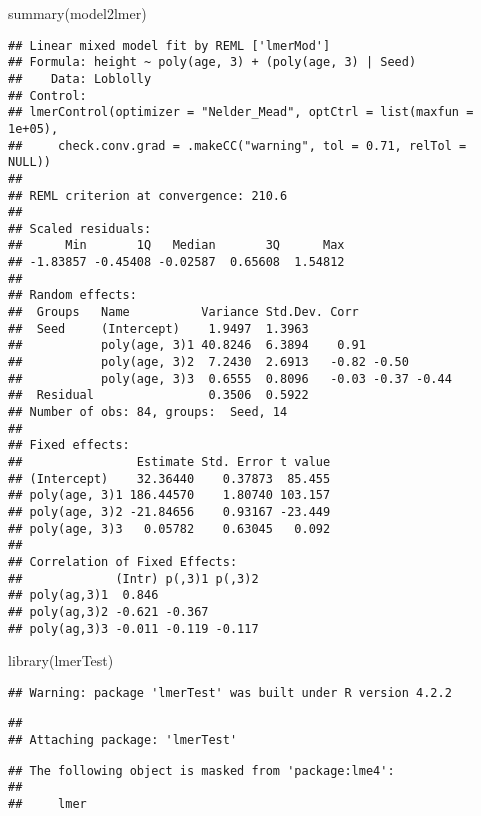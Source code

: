\documentclass[
]{book}
\newenvironment{Shaded}{\begin{snugshade}}{\end{snugshade}}
\newcommand{\FunctionTok}[1]{\textcolor[rgb]{0.00,0.00,0.00}{#1}}
\newcommand{\NormalTok}[1]{#1}
\begin{document}
\begin{Shaded}
\begin{Highlighting}[]
\FunctionTok{summary}\NormalTok{(model2lmer)}
\end{Highlighting}
\end{Shaded}

\begin{verbatim}
## Linear mixed model fit by REML ['lmerMod']
## Formula: height ~ poly(age, 3) + (poly(age, 3) | Seed)
##    Data: Loblolly
## Control: 
## lmerControl(optimizer = "Nelder_Mead", optCtrl = list(maxfun = 1e+05),  
##     check.conv.grad = .makeCC("warning", tol = 0.71, relTol = NULL))
## 
## REML criterion at convergence: 210.6
## 
## Scaled residuals: 
##      Min       1Q   Median       3Q      Max 
## -1.83857 -0.45408 -0.02587  0.65608  1.54812 
## 
## Random effects:
##  Groups   Name          Variance Std.Dev. Corr             
##  Seed     (Intercept)    1.9497  1.3963                    
##           poly(age, 3)1 40.8246  6.3894    0.91            
##           poly(age, 3)2  7.2430  2.6913   -0.82 -0.50      
##           poly(age, 3)3  0.6555  0.8096   -0.03 -0.37 -0.44
##  Residual                0.3506  0.5922                    
## Number of obs: 84, groups:  Seed, 14
## 
## Fixed effects:
##                Estimate Std. Error t value
## (Intercept)    32.36440    0.37873  85.455
## poly(age, 3)1 186.44570    1.80740 103.157
## poly(age, 3)2 -21.84656    0.93167 -23.449
## poly(age, 3)3   0.05782    0.63045   0.092
## 
## Correlation of Fixed Effects:
##             (Intr) p(,3)1 p(,3)2
## poly(ag,3)1  0.846              
## poly(ag,3)2 -0.621 -0.367       
## poly(ag,3)3 -0.011 -0.119 -0.117
\end{verbatim}

\begin{Shaded}
\begin{Highlighting}[]
\FunctionTok{library}\NormalTok{(lmerTest)}
\end{Highlighting}
\end{Shaded}

\begin{verbatim}
## Warning: package 'lmerTest' was built under R version 4.2.2
\end{verbatim}

\begin{verbatim}
## 
## Attaching package: 'lmerTest'
\end{verbatim}

\begin{verbatim}
## The following object is masked from 'package:lme4':
## 
##     lmer
\end{verbatim}
\end{document}
